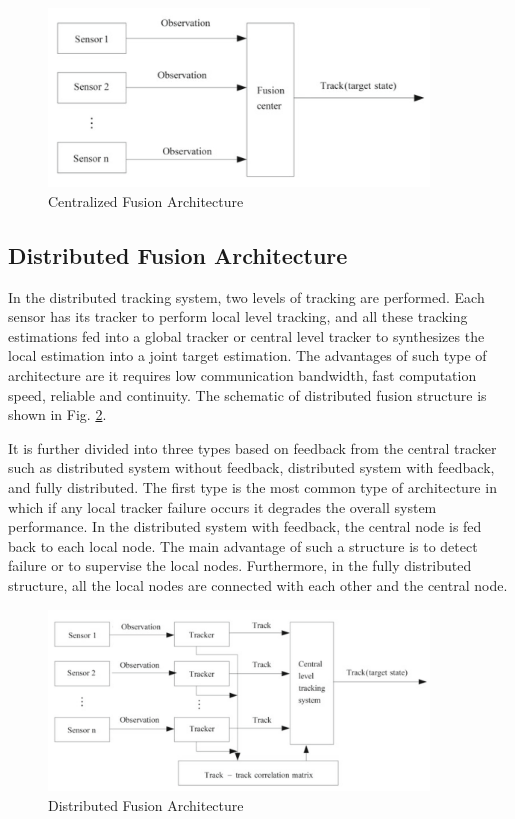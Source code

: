\begin{figure}
    \centering
    \includegraphics[width=0.9\textwidth]{Images/centralized.png}
    \caption{Centralized Fusion Architecture \cite{yan}}
    \label{centralized}
\end{figure}

\subsection{Distributed Fusion Architecture}
In the distributed tracking system, two levels of tracking are performed. Each sensor has its tracker to perform local level tracking, and all these tracking estimations fed into a global tracker or central level tracker to synthesizes the local estimation into a joint target estimation. The advantages of such type of architecture are it requires low communication bandwidth, fast computation speed, reliable and continuity. The schematic of distributed fusion structure is shown in Fig. \ref{distributed}. 

It is further divided into three types based on feedback from the central tracker such as distributed system without feedback, distributed system with feedback, and fully distributed. The first type is the most common type of architecture in which if any local tracker failure occurs it degrades the overall system performance. In the distributed system with feedback, the central node is fed back to each local node. The main advantage of such a structure is to detect failure or to supervise the local nodes. Furthermore, in the fully distributed structure, all the local nodes are connected with each other and the central node.   

\begin{figure}
    \centering
    \includegraphics[width=0.9\textwidth]{Images/distributed.png}
    \caption{Distributed Fusion Architecture \cite{yan}}
    \label{distributed}
\end{figure}

